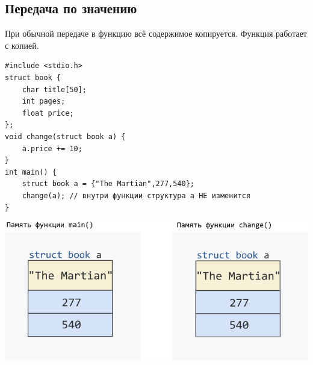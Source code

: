 \documentclass{article}
\begin{document}
\subsection*{Передача по значению}
При обычной передаче в функцию всё содержимое копируется. Функция работает с копией.
\begin{lstlisting}
#include <stdio.h>
struct book {
    char title[50];
    int pages;
    float price;
};
void change(struct book a) {
    a.price += 10;
}
int main() {
    struct book a = {"The Martian",277,540};
    change(a); // внутри функции структура a НЕ изменится
}
\end{lstlisting}
\begin{center}
\includegraphics[scale=0.6]{../images/structpassbyvalue.png}
\end{center}
\end{document}
